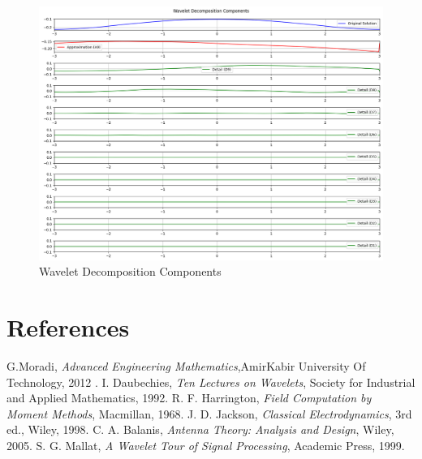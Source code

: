 \documentclass[12pt]{article}
\begin{document}
\begin{figure}[h!]
    \centering
    \includegraphics[width=\textwidth]{3.png}
    \caption{Wavelet Decomposition Components}
\end{figure}

\newpage

\clearpage

\section{References}

\begin{thebibliography}{99}
     G.Moradi, \textit{Advanced Engineering Mathematics},AmirKabir University Of Technology, 2012 .
     I. Daubechies, \textit{Ten Lectures on Wavelets}, Society for Industrial and Applied Mathematics, 1992.
     R. F. Harrington, \textit{Field Computation by Moment Methods}, Macmillan, 1968.
     J. D. Jackson, \textit{Classical Electrodynamics}, 3rd ed., Wiley, 1998.
     C. A. Balanis, \textit{Antenna Theory: Analysis and Design}, Wiley, 2005.
     S. G. Mallat, \textit{A Wavelet Tour of Signal Processing}, Academic Press, 1999.
\end{thebibliography}
\end{document}
